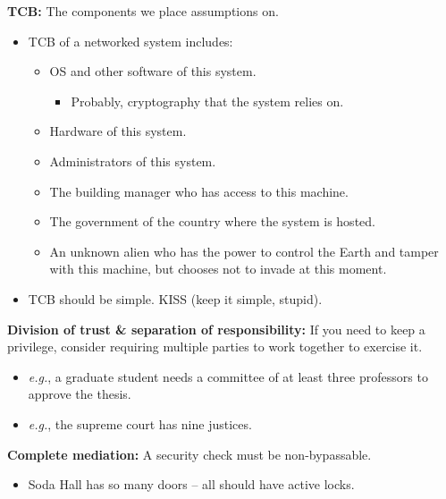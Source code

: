 \documentclass{article}
\newcommand{\parhead}[1]{\noindent \textbf{#1}}
\begin{document}
\smallskip\parhead{TCB:} The components we place assumptions on.
\begin{itemize}
    \item TCB of a networked system includes:
    \begin{itemize}
        \item OS and other software of this system.
        \begin{itemize}
            \item Probably, cryptography that the system relies on.
        \end{itemize}
        \item Hardware of this system.
        \item Administrators of this system.
        \item The building manager who has access to this machine.
        \item The government of the country where the system is hosted.
        \item An unknown alien who has the power to control the Earth and tamper with this machine, but chooses not to invade at this moment.
    \end{itemize}
    \item TCB should be simple. KISS (keep it simple, stupid).
\end{itemize}

\smallskip\parhead{Division of trust \& separation of responsibility:}
If you need to keep a privilege, consider requiring multiple parties to work together to exercise it.
\begin{itemize}
    \item \emph{e.g.}, a graduate student needs a committee of at least three professors to approve the thesis.
    
    \item \emph{e.g.}, the supreme court has nine justices.
\end{itemize}

\smallskip\parhead{Complete mediation:} A security check must be non-bypassable. 
\begin{itemize}
    \item Soda Hall has so many doors -- all should have active locks.
\end{itemize}
\end{document}

